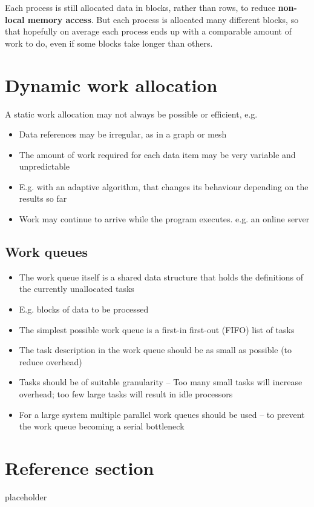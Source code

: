 \documentclass{article}
\begin{document}
\begin{flushleft}
Each process is still allocated data in blocks, rather than rows, to reduce \textbf{non-local memory access}. But each process is allocated many different blocks, so that hopefully on average each process ends up with a comparable amount of work to do, even if some blocks take longer than others.
\end{flushleft}

\section{Dynamic work allocation}
\begin{flushleft}
A static work allocation may not always be possible or efficient, e.g.
\begin{itemize}
  \item Data references may be irregular, as in a graph or mesh
  \item The amount of work required for each data item may be very variable and unpredictable 
  \item E.g. with an adaptive algorithm, that changes its behaviour depending on the results so far
  \item Work may continue to arrive while the program executes. e.g. an online server
\end{itemize}
\end{flushleft}

\subsection{Work queues}
\begin{flushleft}
\begin{itemize}
  \item The work queue itself is a shared data structure that holds the definitions of the currently unallocated tasks 
  \item E.g. blocks of data to be processed 
  \item The simplest possible work queue is a first-in first-out (FIFO) list of tasks
  \item The task description in the work queue should be as small as possible (to reduce overhead)
  \item Tasks should be of suitable granularity – Too many small tasks will increase overhead; too few large tasks will result in idle processors 
  \item For a large system multiple parallel work queues should be used – to prevent the work queue becoming a serial bottleneck
\end{itemize}
\end{flushleft}

\pagebreak
\section*{Reference section} \label{sec:reference}
\begin{description}
	\item[placeholder] \hfill \\
\end{description}
\end{document}
